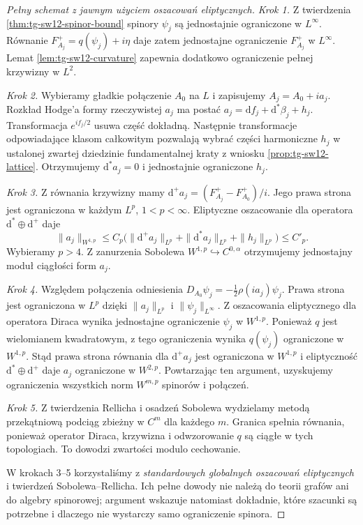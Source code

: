 \documentclass[11pt,a4paper]{report}
\numberwithin{equation}{section}
\theoremstyle{plain}
\theoremstyle{definition}
\theoremstyle{remark}
\begin{document}
\begin{proof}[Pełny schemat z jawnym użyciem oszacowań eliptycznych]
\emph{Krok 1.} Z twierdzenia \ref{thm:tg-sw12-spinor-bound}
spinory $\psi_j$ są jednostajnie ograniczone w $L^\infty$.
Równanie $F_{A_j}^+=q(\psi_j)+i\eta$ daje zatem
jednostajne ograniczenie $F_{A_j}^+$ w $L^\infty$.
Lemat \ref{lem:tg-sw12-curvature} zapewnia dodatkowo
ograniczenie pełnej krzywizny w $L^2$.

\emph{Krok 2.} Wybieramy gładkie połączenie $A_0$ na $L$
i zapisujemy $A_j=A_0+i a_j$.
Rozkład Hodge'a formy rzeczywistej $a_j$ ma postać
$a_j=\mathrm df_j+\mathrm d^*\beta_j+h_j$.
Transformacja $e^{if_j/2}$ usuwa część dokładną.
Następnie transformacje odpowiadające klasom całkowitym
pozwalają wybrać części harmoniczne $h_j$ w ustalonej
zwartej dziedzinie fundamentalnej kraty z
wniosku \ref{prop:tg-sw12-lattice}. Otrzymujemy
$\mathrm d^*a_j=0$ i jednostajnie ograniczone $h_j$.

\emph{Krok 3.} Z równania krzywizny mamy
$\mathrm d^+a_j=(F_{A_j}^+-F_{A_0}^+)/i$.
Jego prawa strona jest ograniczona w każdym $L^p$,
$1<p<\infty$. Eliptyczne oszacowanie dla operatora
$\mathrm d^*\oplus\mathrm d^+$ daje
\[
\|a_j\|_{W^{1,p}}\le C_p
\bigl(\|\mathrm d^+a_j\|_{L^p}
+\|\mathrm d^*a_j\|_{L^p}+\|h_j\|_{L^p}\bigr)\le C'_p.
\]
Wybieramy $p>4$. Z zanurzenia Sobolewa
$W^{1,p}\hookrightarrow C^{0,\alpha}$ otrzymujemy
jednostajny moduł ciągłości form $a_j$.

\emph{Krok 4.} Względem połączenia odniesienia
$D_{A_0}\psi_j=-\tfrac12\rho(i a_j)\psi_j$.
Prawa strona jest ograniczona w $L^p$ dzięki
$\|a_j\|_{L^p}$ i $\|\psi_j\|_{L^\infty}$.
Z oszacowania eliptycznego dla operatora Diraca
wynika jednostajne ograniczenie $\psi_j$ w $W^{1,p}$.
Ponieważ $q$ jest wielomianem kwadratowym, z tego
ograniczenia wynika $q(\psi_j)$ ograniczone w $W^{1,p}$.
Stąd prawa strona równania dla $\mathrm d^+a_j$ jest
ograniczona w $W^{1,p}$ i eliptyczność
$\mathrm d^*\oplus\mathrm d^+$ daje $a_j$ ograniczone w
$W^{2,p}$. Powtarzając ten argument, uzyskujemy
ograniczenia wszystkich norm $W^{m,p}$ spinorów i połączeń.

\emph{Krok 5.} Z twierdzenia Rellicha i osadzeń Sobolewa
wydzielamy metodą przekątniową podciąg zbieżny w $C^m$
dla każdego $m$. Granica spełnia równania, ponieważ
operator Diraca, krzywizna i odwzorowanie $q$ są ciągłe
w tych topologiach. To dowodzi zwartości modulo cechowanie.

W krokach 3--5 korzystaliśmy z \emph{standardowych globalnych
oszacowań eliptycznych} i twierdzeń Sobolewa--Rellicha.
Ich pełne dowody nie należą do teorii grafów ani do
algebry spinorowej; argument wskazuje natomiast dokładnie,
które szacunki są potrzebne i dlaczego nie wystarczy samo
ograniczenie spinora.
\end{proof}
\end{document}
